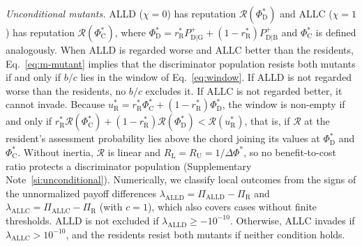 \documentclass[fleqn,10pt]{wlscirep}
\newcommand{\Rmap}{\mathscr{R}}            %
\newcommand{\Pp}[1]{P^{+}_{\mathrm{#1}}}   %
\newcommand{\rR}{r_{\mathrm{R}}^{*}}
\newcommand{\uR}{u_{\mathrm{R}}^{*}}
\newcommand{\dPhi}{\Delta\Phi^{*}}
\newcommand{\ALLC}{\mathrm{ALLC}}
\newcommand{\ALLD}{\mathrm{ALLD}}
\theoremstyle{plain}
\begin{document}
\textit{Unconditional mutants.} ALLD ($\chi=0$) has reputation $\Rmap(\Phi^*_{\mathrm D})$ and ALLC ($\chi=1$) has reputation $\Rmap(\Phi^*_{\mathrm C})$, where $\Phi^*_{\mathrm D}=\rR\Pp{D|G}+(1-\rR)\Pp{D|B}$ and $\Phi^*_{\mathrm C}$ is defined analogously. When ALLD is regarded worse and ALLC better than the residents, Eq.~\eqref{eq:m-mutant} implies that the discriminator population resists both mutants if and only if $b/c$ lies in the window of Eq.~\eqref{eq:window}. If ALLD is not regarded worse than the residents, no $b/c$ excludes it. If ALLC is not regarded better, it cannot invade. Because $\uR=\rR\Phi^*_{\mathrm C}+(1-\rR)\Phi^*_{\mathrm D}$, the window is non-empty if and only if $\rR\Rmap(\Phi^*_{\mathrm C})+(1-\rR)\Rmap(\Phi^*_{\mathrm D})<\Rmap(\uR)$, that is, if $\Rmap$ at the resident's assessment probability lies above the chord joining its values at $\Phi^*_{\mathrm D}$ and $\Phi^*_{\mathrm C}$. Without inertia, $\Rmap$ is linear and $R_{\mathrm L}=R_{\mathrm U}=1/\dPhi$, so no benefit-to-cost ratio protects a discriminator population (Supplementary Note~\ref{si:unconditional}). Numerically, we classify local outcomes from the signs of the unnormalized payoff differences $\lambda_{\ALLD}=\Pi_{\ALLD}-\Pi_{\mathrm R}$ and $\lambda_{\ALLC}=\Pi_{\ALLC}-\Pi_{\mathrm R}$ (with $c=1$), which also covers cases without finite thresholds. ALLD is not excluded if $\lambda_{\ALLD}\geq-10^{-10}$. Otherwise, ALLC invades if $\lambda_{\ALLC}>10^{-10}$, and the residents resist both mutants if neither condition holds.
\end{document}
